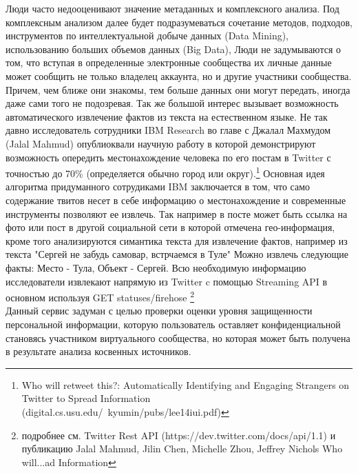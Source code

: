 \begin{chap1}
Люди часто недооценивают значение метаданных и комплексного анализа. 
Под комплексным анализом далее будет подразумеваться сочетание методов, подходов, инструментов по интеллектуальной добыче данных (Data Mining), %
использованию больших объемов данных (Big Data), 
Люди не задумываются о том, что вступая в определенные электронные сообщества их личные данные может сообщить не только владелец аккаунта, но и другие участники сообщества. Причем, чем ближе они знакомы, тем больше данных они могут передать, иногда даже сами того не подозревая. Так же большой интерес вызывает возможность автоматического извлечение фактов из текста на естественном языке. Не так давно исследователь сотрудники IBM Research во главе с Джалал Махмудом (Jalal Mahmud) опублиоквали научную работу в которой демонстрируют возможность опередить местонахождение человека по его постам в Twitter с точностью до 70\% (определяется обычно город или округ).\footnote{Who will retweet this?: Automatically Identifying and Engaging Strangers on Twitter to Spread Information (digital.cs.usu.edu/~kyumin/pubs/lee14iui.pdf‎)}
 Основная идея алгоритма придуманного сотрудиками IBM заключается в том, что само содержание твитов несет в себе информацию о местонахождение и современные  инструменты  позволяют ее извлечь. Так например в посте может быть ссылка на фото или пост в другой социальной сети в которой отмечена гео-информация, кроме того анализируются симантика текста для извлечение фактов, например из текста "Сергей не забудь самовар, встрчаемся в Туле" Можно извлечь следующие факты: Место - Тула, Объект - Сергей. Всю необходимую информацию исследователи извлекают напрямую из Twitter c помощью Streaming API в основном используя GET statuses/firehose \footnote{подробнее см. Twitter Rest API (https://dev.twitter.com/docs/api/1.1) и публикацию Jalal Mahmud, Jilin Chen, Michelle Zhou, Jeffrey Nichols Who will...ad Information} \\



Данный сервис задуман с целью проверки оценки уровня защищенности персональной информации, которую пользователь оставляет конфиденциальной становясь участником виртуального сообщества, но которая может быть получена в результате анализа косвенных источников. \\


\end{chap1}
